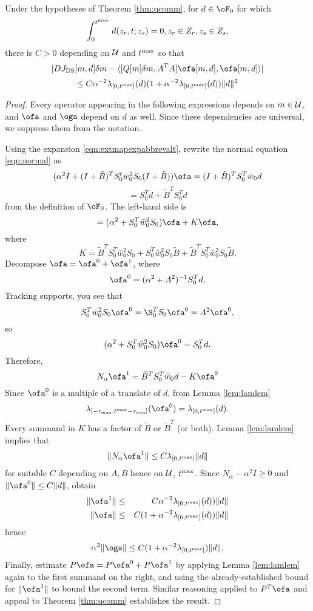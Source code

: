\begin{theorem}
\label{thm:qerr}
Under the hypotheses of Theorem \ref{thm:qcomm}, for $d \in \oF_0$ for
which
\[
\int_0^{t^{\rm max}}\,d(z_r,t;z_s) = 0, z_r \in Z_r, z_s \in Z_s,
\]
there is $C >0$
depending on ${\cal U}$ and $t^{\rm max}$ so that
\[
|DJ_{\rm DS}[m,d]\delta m - \langle [Q[m]\delta
m,A^TA]\ofa[m,d],\ofa[m,d]\rangle| 
\]
\[
\le C \alpha^{-2}\lambda_{[0,t^{\rm max}]}(d)(1+\alpha^{-2}\lambda_{[0,t^{\rm max}]}(d))\|d\|^2
\]
\end{theorem}
\begin{proof}
Every operator appearing in the following expressions depends on $m
\in {\cal U}$, and $\ofa$ and $\oga$ depend on $d$ as well. Since these
dependencies are universal, we suppress them from the notation.

Using the expansion \ref{eqn:extmapexpabbrevalt}, rewrite the normal
equation \ref{eqn:normal} as
\[
(\alpha^2 I + (I+\tilde{B})^TS_0^t \bar{w}_0^2 S_0 (I+\tilde{B})) \ofa
= (I+\tilde{B})^TS_0^T \bar{w}_0d
\]
\[
=S_0^T d +\tilde{B}^TS_0^T d
\] 
from the definition of $\oF_0$. The left-hand side is
\[
= (\alpha^2 + S_0^T\bar{w}_0^2S_0) \ofa  + K \ofa,
\]
where
\[
K = \tilde{B}^T S_0^T\bar{w}_0^2S_0 + S_0^T\bar{w}_0^2S_0\tilde{B}
+ \tilde{B}^T S_0^T\bar{w}_0^2S_0\tilde{B}.
\]
Decompose $\ofa = \ofa^0 + \ofa^1$, where
\[
\ofa^0 = (\alpha^2 + A^2)^{-1}S_0^T d.
\]
Tracking supports, you see that
\[
S_0^T\bar{w}_0^2S_0 \ofa^0 = \S_0^TS_0\ofa^0 = A^2 \ofa^0,
\]
so 
\[
(\alpha^2 + S_0^T\bar{w}_0^2S_0) \ofa^0 =S_0^T d.
\]
Therefore, 
\[
N_{\alpha}\ofa^1 = \tilde{B}^TS_0^T \bar{w}_0d - K\ofa^0
\]
Since $\ofa^0$ is a multiple of a translate of $d$, from Lemma \ref{lem:lamlem} 
\[
\lambda_{[-\tau_{\rm max},t^{\rm max}-\tau_{\rm min}]}(\ofa^0) =
  \lambda_{[0,t^{\rm max}]}(d).
\]
Every summand in $K$ has a factor of $\tilde{B}$ or $\tilde{B}^T$ (or
both). Lemma \ref{lem:lamlem} implies that
\[
\|N_{\alpha}\ofa^1\| \le C \lambda_{[0,t^{\rm max}]}\|d\|
\] 
for suitable $C$ depending on $A, B$ hence on ${\cal U}$, $t^{\rm
  max}$. Since $N_{\alpha}-\alpha^2I \ge 0$ and $\|\ofa^0\|\le C\|d\|$,
obtain
\begin{eqnarray}
\label{eqn:f1barbd}
\|\ofa^1\| & \le & C \alpha^{-2}\lambda_{[0,t^{\rm max}]}(d))\|d\|\\
\label{eqn:fbarbd}
\|\ofa\| & \le & C(1 + \alpha^{-2}\lambda_{[0,t^{\rm max}]}(d))\|d\|
\end{eqnarray}
hence
\[
\alpha^2\|\oga\| \le C(1 + \alpha^{-2}\lambda_{[0,t^{\rm max}]})\|d\|.
\]
Finally, estimate $P \ofa = P \ofa^0  + P \ofa^1$ by applying Lemma
\ref{lem:lamlem} again to the first summand on the right, and using
the already-established bound for $\|\ofa^1\|$ to bound the second
term. Similar reasoning applied to $P^T \ofa$ and appeal to Theorem
\ref{thm:qcomm} establishes the result.
\end{proof}



